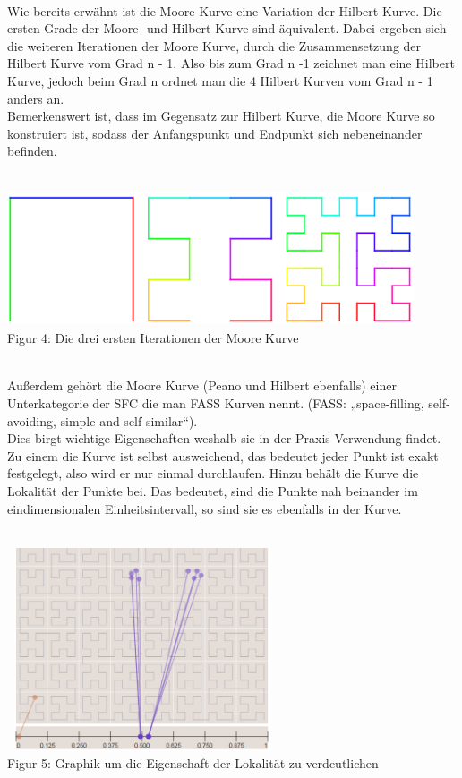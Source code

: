 \documentclass[course=erap]{aspdoc}
\begin{document}
\   \\
\newpage %
Wie bereits erwähnt ist die Moore Kurve eine Variation der Hilbert Kurve. Die ersten Grade der Moore- und Hilbert-Kurve sind äquivalent. Dabei ergeben sich die weiteren Iterationen der Moore Kurve, durch die Zusammensetzung der Hilbert Kurve vom Grad n - 1.  Also bis zum Grad n -1 zeichnet man eine Hilbert Kurve, jedoch beim Grad n ordnet man die 4 Hilbert Kurven vom Grad n - 1 anders an.\\ %
Bemerkenswert ist, dass im Gegensatz zur Hilbert Kurve, die Moore Kurve so konstruiert ist, sodass der Anfangspunkt und Endpunkt sich nebeneinander befinden.
\\
\\
\begin{center}
    \includegraphics[width=12cm, height=4cm]{Moore}\\   %
    \tiny Figur 4: Die drei ersten Iterationen der Moore Kurve
\end{center}
\   \\
Außerdem gehört die Moore Kurve (Peano und Hilbert ebenfalls) einer Unterkategorie der SFC die man FASS Kurven nennt. (FASS: „space-filling, self-avoiding, simple and self-similar“).\\
Dies birgt wichtige Eigenschaften weshalb sie in der Praxis Verwendung findet. Zu einem die Kurve ist selbst ausweichend, das bedeutet jeder Punkt ist exakt festgelegt, also wird er nur einmal durchlaufen. Hinzu behält die Kurve die Lokalität der Punkte bei. Das bedeutet, sind die Punkte nah beinander im eindimensionalen Einheitsintervall, so sind sie es ebenfalls in der Kurve. %
\\
\\
\begin{center}
    \includegraphics[width=8cm, height=6cm]{Locality}\\ %
    \tiny Figur 5: Graphik um die Eigenschaft der Lokalität zu verdeutlichen %
\end{center} 
\newpage 
\end{document}
